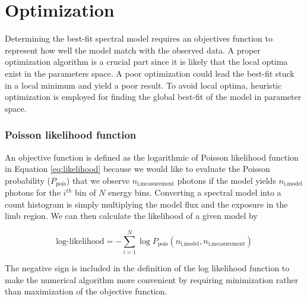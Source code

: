 \section{Optimization}
Determining the best-fit spectral model requires an objectives function
to represent how well the model match with the observed data.
A proper optimization algorithm is
a crucial part since it is likely that the local optima exist in the parameters space. A poor optimization could lead the best-fit
stuck in a local minimum and yield a poor result. To avoid 
local optima, heuristic optimization is employed for finding the 
global best-fit of the model in parameter space.


\subsubsection{Poisson likelihood function}
An objective function is defined as the logarithmic of Poisson likelihood function 
in Equation \ref{eq:likelihood}
because we would like to evaluate the Poisson probability ($P_\text{pois}$)
that we observe $n_{\text{i,measurement}}$ photons if the model yields
$n_{\text{i,model}}$ photons for the $i^{th}$ bin of $N$ energy bins.
Converting
a spectral model into
a count histogram is simply
multiplying the model flux and the exposure
in the limb region.
We can then calculate the likelihood of a given model by

\begin{equation}
    \text{log-likelihood} = -\sum_{i=1}^{N} \log P_{\text{pois}}(n_{\text{i,model}}, n_{\text{i,measurement}})
    \label{eq:likelihood}
\end{equation}

The negative sign is included in the definition of the log likelihood
function to make the numerical algorithm more convenient by requiring
minimization rather than maximization of the objective function. 


